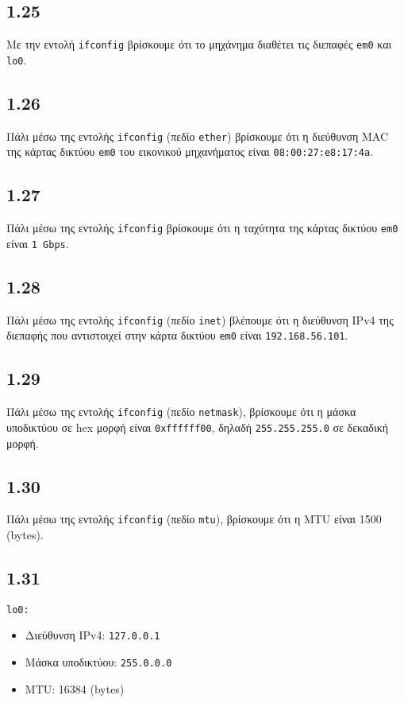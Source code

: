 \documentclass[a4paper, 12pt]{article}
\begin{document}
	\subsection*{1.25}
		Με την εντολή \verb|ifconfig| βρίσκουμε ότι το μηχάνημα διαθέτει τις διεπαφές \verb|em0| και \verb|lo0|.
	
	\subsection*{1.26}
		Πάλι μέσω της εντολής \verb|ifconfig| (πεδίο \verb|ether|) βρίσκουμε ότι η διεύθυνση MAC της κάρτας δικτύου \verb|em0| του εικονικού μηχανήματος είναι \verb|08:00:27:e8:17:4a|.
	
	\subsection*{1.27}
		Πάλι μέσω της εντολής \verb|ifconfig| βρίσκουμε ότι η ταχύτητα της κάρτας δικτύου \verb|em0| είναι \verb|1 Gbps|.
	
	\subsection*{1.28}
		Πάλι μέσω της εντολής \verb|ifconfig| (πεδίο \verb|inet|) βλέπουμε ότι η διεύθυνση IPv4 της διεπαφής που αντιστοιχεί στην κάρτα δικτύου \verb|em0| είναι \verb|192.168.56.101|.
	
	\subsection*{1.29}
		Πάλι μέσω της εντολής \verb|ifconfig| (πεδίο \verb|netmask|), βρίσκουμε ότι η μάσκα υποδικτύου σε hex μορφή είναι \verb|0xffffff00|, δηλαδή \verb|255.255.255.0| σε δεκαδική μορφή.  
	
	\subsection*{1.30}
		Πάλι μέσω της εντολής \verb|ifconfig| (πεδίο \verb|mtu|), βρίσκουμε ότι η MTU είναι 1500 (bytes). 
	
	\subsection*{1.31}
		\verb|lo0:|
		\begin{itemize}
			\item Διεύθυνση IPv4: \verb|127.0.0.1|
			\item Μάσκα υποδικτύου: \verb|255.0.0.0|
			\item MTU: 16384 (bytes)
		\end{itemize}
	
\end{document}
